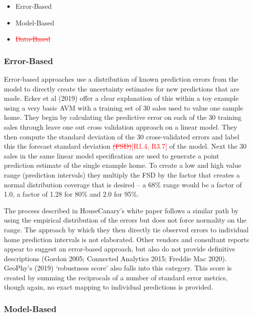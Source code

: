 \documentclass[colTwo]{anon}
\theoremstyle{definition}
\begin{document}
\begin{itemize}
\item Error-Based
\item Model-Based
\item \textcolor{red}{\st{Data-Based}}
\end{itemize}

\subsubsection{Error-Based}

Error-based approaches use a distribution of known prediction errors from the model to directly create the uncertainty estimates for new predictions that are made.  Ecker et al (2019) offer a clear explanation of this within a toy example using a very basic AVM with a training set of 30 sales used to value one sample home.  They begin by calculating the predictive error on each of the 30 training sales through leave one out cross validation approach on a linear model.  They then compute the standard deviation of the 30 cross-validated errors and label this the forecast standard deviation \textcolor{red}{\st{(FSD)}[R1.4, R3.7]} of the model. Next the 30 sales in the same linear model specification are used to generate a point prediction estimate of the single example home.  To create a low and high value range (prediction intervals) they multiply the FSD by the factor that creates a normal distribution coverage that is desired -- a 68\% range would be a factor of 1.0, a factor of 1.28 for 80\% and 2.0 for 95\%. 

The process described in HouseCanary’s white paper follows a similar path by using the empirical distribution of the errors but does not force normality on the range. The approach by which they then directly tie observed errors to individual home prediction intervals is not elaborated. Other vendors and consultant reports appear to suggest an error-based approach, but also do not provide definitive descriptions (Gordon 2005; Connected Analytics 2015; Freddie Mac 2020). GeoPhy’s (2019) ‘robustness score’ also falls into this category.  This score is created by summing the reciprocals of a number of standard error metrics, though again, no exact mapping to individual predictions is provided.  

\subsubsection{Model-Based}
\end{document}
